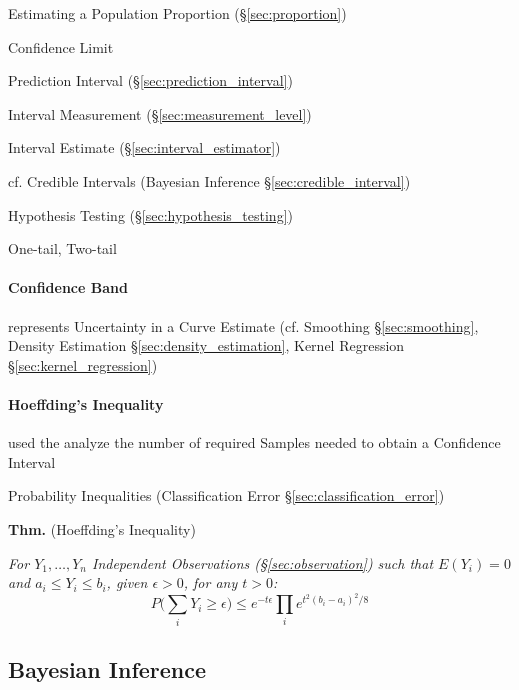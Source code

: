 Estimating a Population Proportion (\S\ref{sec:proportion})

Confidence Limit

Prediction Interval (\S\ref{sec:prediction_interval})

Interval Measurement (\S\ref{sec:measurement_level})

Interval Estimate (\S\ref{sec:interval_estimator})

cf. Credible Intervals (Bayesian Inference \S\ref{sec:credible_interval})

Hypothesis Testing (\S\ref{sec:hypothesis_testing})

One-tail, Two-tail



\paragraph{Confidence Band}\label{sec:confidence_band}\hfill

represents Uncertainty in a Curve Estimate (cf. Smoothing \S\ref{sec:smoothing},
Density Estimation \S\ref{sec:density_estimation}, Kernel Regression
\S\ref{sec:kernel_regression})



\paragraph{Hoeffding's Inequality}\label{sec:hoeffdings_inequality}\hfill

used the analyze the number of required Samples needed to obtain a Confidence
Interval

\fist Probability Inequalities (Classification Error
\S\ref{sec:classification_error})

\textbf{Thm.} (Hoeffding's Inequality)

\emph{
  For $Y_1, \ldots, Y_n$ Independent Observations (\S\ref{sec:observation}) such
  that $E(Y_i) = 0$ and $a_i \leq Y_i \leq b_i$, given $\epsilon > 0$, for any
  $t > 0$:
  \[
    P\Big(\sum_i Y_i \geq \epsilon\Big) \leq
      e^{-t\epsilon} \prod_i e^{t^2(b_i - a_i)^2/8}
  \]
}



\subsection{Bayesian Inference}\label{sec:bayesian_inference}

